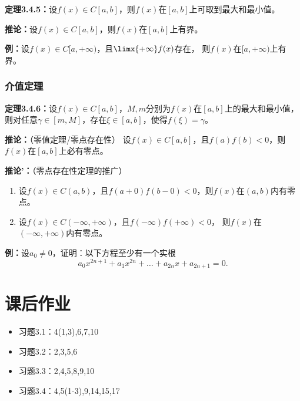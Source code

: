 {\bf 定理3.4.5：}设$f(x)\in C[a,b]$，则$f(x)$在$[a,b]$上可取到最大和最小值。

{\bf 推论：}设$f(x)\in C[a,b]$，则$f(x)$在$[a,b]$上有界。

{\bf 例：}设$f(x)\in C[a,+\infty)$，且$\limx{+\infty}f(x)$存在，
则$f(x)$在$[a,+\infty)$上有界。

\subsubsection{介值定理}

{\bf 定理3.4.6：}设$f(x)\in C[a,b]$，$M,m$分别为$f(x)$在$[a,b]$上的最大和最小值，
则对任意$\gamma\in[m,M]$，存在$\xi\in[a,b]$，使得$f(\xi)=\gamma$。

{\bf 推论：}（零值定理/零点存在性）
设$f(x)\in C[a,b]$，且$f(a)f(b)<0$，则$f(x)$在$[a,b]$上必有零点。

{\bf 推论'：}（零点存在性定理的推广）
\begin{enumerate}[(1)]
  \setlength{\itemindent}{1cm}
  \item 设$f(x)\in C(a,b)$，且$f(a+0)f(b-0)<0$，则$f(x)$在$(a,b)$内有零点。 
  \item 设$f(x)\in C(-\infty,+\infty)$，且$f(-\infty)f(+\infty)<0$，
  则$f(x)$在$(-\infty,+\infty)$内有零点。
\end{enumerate}

{\bf 例：}设$a_0\ne 0$，证明：以下方程至少有一个实根
$$a_0x^{2n+1}+a_1x^{2n}+\ldots+a_{2n}x+a_{2n+1}=0.$$

\newpage

\section*{课后作业}

\begin{itemize}
  \item 习题3.1：4(1,3),6,7,10
  \item 习题3.2：2,3,5,6
  \item 习题3.3：2,4,5,8,9,10
  \item 习题3.4：4,5(1-3),9,14,15,17
\end{itemize}

